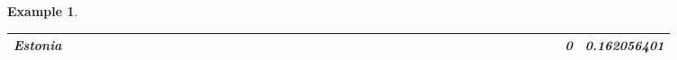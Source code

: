 \documentclass[a4paper,11pt]{report}
\newtheorem{example}[theorem]{Example}
\begin{document}
\begin{example}
\begin{appendices}
\begin{landscape}
\begin{longtable}{r|r|r|r|r|r|r|r|r|r|r|r|r|r|r|r|r|r|r|r|r|r|r|r|r|r|r|r|r|r|r|r|r|r|r|r|r|r|r|r|r|r|}
\multicolumn{1}{|r|}{\textbf{Estonia}}         &                                       &                                       &                                       &                                          &                                       &                                       &                                       &                                       &                                                &                                       &                                      &                                       &                                       &                                      &                                       &                                       &                                       &                                      &                                     &                                      &                                         &                                     &                                       &                                          &                                      &                                      &                                        &                                       &                                      &                                          &                                        &                                     &                                      &                                           &                                               &                                       &                                              &                                      &                                     & 0                                             & 0.162056401                             \\ \hline

\end{longtable}
\end{landscape}
\end{appendices}
\end{example}
\end{document}
